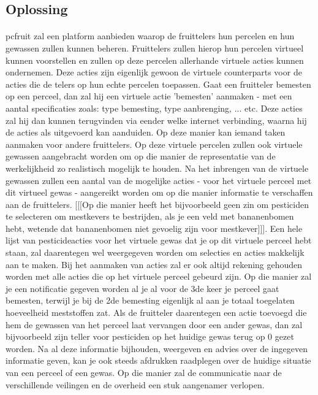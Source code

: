 \subsection {Oplossing}

\paragraph {} pcfruit zal een platform aanbieden waarop de fruittelers hun percelen en hun gewassen zullen kunnen beheren. Fruittelers zullen hierop hun percelen virtueel kunnen voorstellen en zullen op deze percelen allerhande virtuele acties kunnen ondernemen. Deze acties zijn eigenlijk gewoon de virtuele counterparts voor de acties die de telers op hun echte percelen toepassen. Gaat een fruitteler bemesten op een perceel, dan zal hij een virtuele actie 'bemesten' aanmaken - met een aantal specificaties zoals: type bemesting, type aanbrenging, ... etc. Deze acties zal hij dan kunnen terugvinden via eender welke internet verbinding, waarna hij de acties als uitgevoerd kan aanduiden. Op deze manier kan iemand taken aanmaken voor andere fruittelers. Op deze virtuele percelen zullen ook virtuele gewassen aangebracht worden om op die manier de representatie van de werkelijkheid zo realistisch mogelijk te houden. Na het inbrengen van de virtuele gewassen zullen een aantal van de mogelijke acties - voor het virtuele perceel met dit virtueel gewas - aangereikt worden om op die manier informatie te verschaffen aan de fruittelers. [[[Op die manier heeft het bijvoorbeeld geen zin om pesticiden te selecteren om mestkevers te bestrijden, als je een veld met bananenbomen hebt, wetende dat bananenbomen niet gevoelig zijn voor mestkever]]]. Een hele lijst van pesticideacties voor het virtuele gewas dat je op dit virtuele perceel hebt staan, zal daarentegen wel weergegeven worden om selecties en acties makkelijk aan te maken. Bij het aanmaken van acties zal er ook altijd rekening gehouden worden met alle acties die op het virtuele perceel gebeurd zijn. Op die manier zal je een notificatie gegeven worden al je al voor de 3de keer je perceel gaat bemesten, terwijl je bij de 2de bemesting eigenlijk al aan je totaal toegelaten hoeveelheid meststoffen zat. Als de fruitteler daarentegen een actie toevoegd die hem de gewassen van het perceel laat vervangen door een ander gewas, dan zal bijvoorbeeld zijn teller voor pesticiden op het huidige gewas terug op 0 gezet worden. Na al deze informatie bijhouden, weergeven en advies over de ingegeven informatie geven, kan je ook steeds afdrukken raadplegen over de huidige situatie van een perceel of een gewas. Op die manier zal de communicatie naar de verschillende veilingen en de overheid een stuk aangenamer verlopen.

